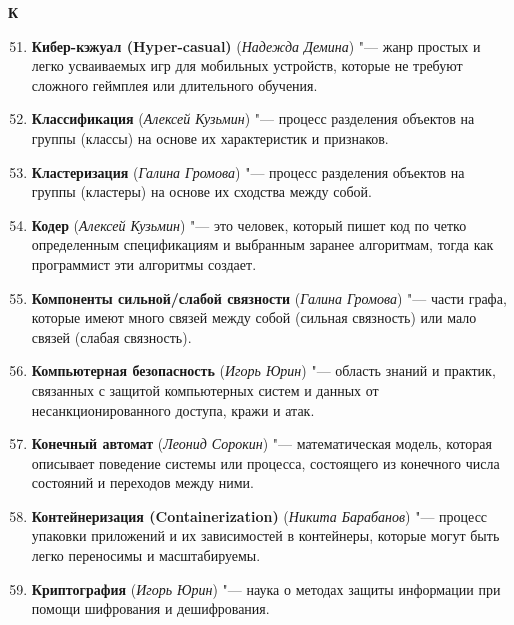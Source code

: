 \begin{flushleft} \large\textbf{К} \end{flushleft}

\begin{enumerate}
    \setcounter{enumi}{50}

    \item \textbf{Кибер-кэжуал (Hyper-casual)} (\textit{Надежда Демина}) "--- 
    жанр простых и легко усваиваемых игр для мобильных устройств, которые не требуют сложного геймплея или длительного обучения.

    \item \textbf{Классификация} (\textit{Алексей Кузьмин}) "--- 
    процесс разделения объектов на группы (классы) на основе их характеристик и признаков.

    \item \textbf{Кластеризация} (\textit{Галина Громова}) "--- 
    процесс разделения объектов на группы (кластеры) на основе их сходства между собой.

    \item \textbf{Кодер} (\textit{Алексей Кузьмин}) "--- 
    это человек, который пишет код по четко определенным спецификациям и выбранным заранее алгоритмам, тогда как программист эти алгоритмы создает.

    \item \textbf{Компоненты сильной/слабой связности} (\textit{Галина Громова}) "--- 
    части графа, которые имеют много связей между собой (сильная связность) или мало связей (слабая связность).

    \item \textbf{Компьютерная безопасность} (\textit{Игорь Юрин}) "--- 
    область знаний и практик, связанных с защитой компьютерных систем и данных от несанкционированного доступа, кражи и атак.

    \item \textbf{Конечный автомат} (\textit{Леонид Сорокин}) "--- 
    математическая модель, которая описывает поведение системы или процесса, состоящего из конечного числа состояний и переходов между ними. 

    \item \textbf{Контейнеризация (Containerization)} (\textit{Никита Барабанов}) "--- 
    процесс упаковки приложений и их зависимостей в контейнеры, которые могут быть легко переносимы и масштабируемы. 

    \item \textbf{Криптография} (\textit{Игорь Юрин}) "--- 
    наука о методах защиты информации при помощи шифрования и дешифрования. 
\end{enumerate}

